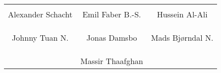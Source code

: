 \begin{table}[H]
	\centering
		\begin{tabular}{c c c}
			\underline{\phantom{mmmmmmmmmmmmmm}} & \underline{\phantom{mmmmmmmmmmmmmm}} & \underline{\phantom{mmmmmmmmmmmmmm}} \\
			Alexander Schacht			& Emil Faber B.-S. 		& Hussein Al-Ali 			\\
			&&\\
			&&\\
			\underline{\phantom{mmmmmmmmmmmmmm}} & \underline{\phantom{mmmmmmmmmmmmmm}} & \underline{\phantom{mmmmmmmmmmmmmm}} \\
			Johnny Tuan N.			& Jonas Damsbo 		& Mads Bjørndal N. 	\\
			&&\\
			&&\\			
&\underline{\phantom{mmmmmmmmmmmmmm}} \\ 														
			& Massir Thaafghan
																		
		\end{tabular}
\end{table}